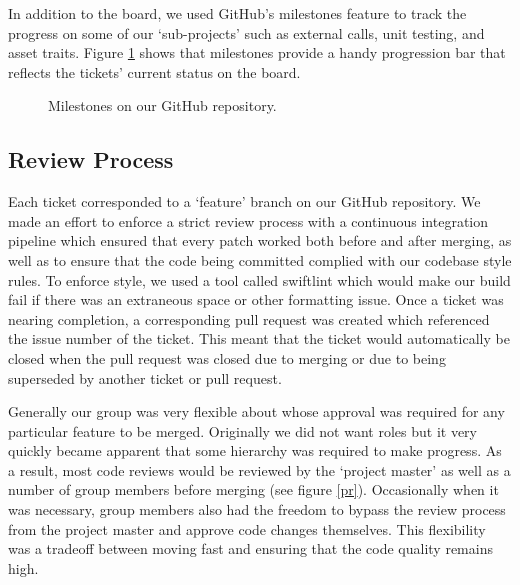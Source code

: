 In addition to the board, we used GitHub's milestones feature to track the progress on some of our `sub-projects' such as external calls, unit testing, and asset traits. Figure \ref{milestones} shows that milestones provide a handy progression bar that reflects the tickets' current status on the board.

\begin{figure}[htbp]
\centering
{}
\caption{Milestones on our GitHub repository.}
\label{milestones}
\end{figure}

\subsection{Review Process}

Each ticket corresponded to a `feature' branch on our GitHub repository. We made an effort to enforce a strict review process with a continuous integration pipeline which ensured that every patch worked both before and after merging, as well as to ensure that the code being committed complied with our codebase style rules. To enforce style, we used a tool called swiftlint which would make our build fail if there was an extraneous space or other formatting issue. Once a ticket was nearing completion, a corresponding pull request was created which referenced the issue number of the ticket. This meant that the ticket would automatically be closed when the pull request was closed due to merging or due to being superseded by another ticket or pull request.

Generally our group was very flexible about whose approval was required for any particular feature to be merged. Originally we did not want roles but it very quickly became apparent that some hierarchy was required to make progress. As a result, most code reviews would be reviewed by the `project master' as well as a number of group members before merging (see figure \ref{pr}). Occasionally when it was necessary, group members also had the freedom to bypass the review process from the project master and approve code changes themselves. This flexibility was a tradeoff between moving fast and ensuring that the code quality remains high.


